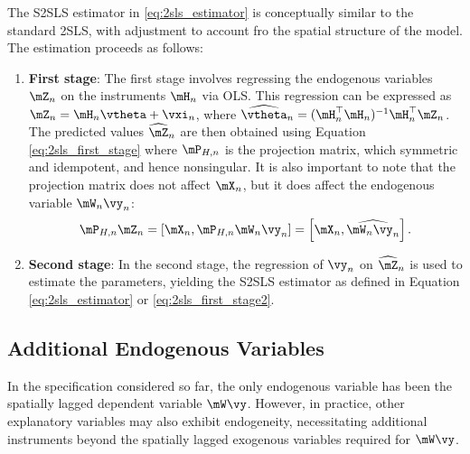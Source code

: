 The S2SLS estimator in \eqref{eq:2sls_estimator} is conceptually similar to the standard 2SLS, with adjustment to account fro the spatial structure of the model. The estimation proceeds as follows:
\begin{enumerate}
  \item \textbf{First stage}: The first stage involves regressing the endogenous variables $\mZ_n$ on the instruments $\mH_n$ via OLS. This regression can be expressed as $\mZ_n = \mH_n\vtheta + \vxi_n$, where $\widehat{\vtheta}_n = (\mH^\top_n\mH_n)^{-1}\mH^\top_n\mZ_n$. The predicted values $\widehat{\mZ}_n$ are then obtained using Equation \eqref{eq:2sls_first_stage} where $\mP_{H,n}$ is the projection matrix, which symmetric and idempotent, and hence nonsingular. It is also important to note that the projection matrix does not affect $\mX_n$, but it does affect the endogenous variable $\mW_n\vy_n$:
\begin{equation}
  \mP_{H, n}\mZ_n = \left[\mX_n, \mP_{H, n}\mW_n\vy_n\right] = \left[\mX_n, \widehat{\mW_n\vy_n}\right].
\end{equation}

\item \textbf{Second stage}: In the second stage, the regression of $\vy_n$ on $\widehat{\mZ}_n$ is used to estimate the parameters, yielding the S2SLS estimator as defined in Equation \eqref{eq:2sls_estimator} or \eqref{eq:2sls_first_stage2}.
\end{enumerate}

\subsection{Additional Endogenous Variables}

In the specification considered so far, the only endogenous variable has been the spatially lagged dependent variable $\mW\vy$. However, in practice, other explanatory variables may also exhibit endogeneity, necessitating additional instruments beyond the spatially lagged exogenous variables required for $\mW\vy$.

